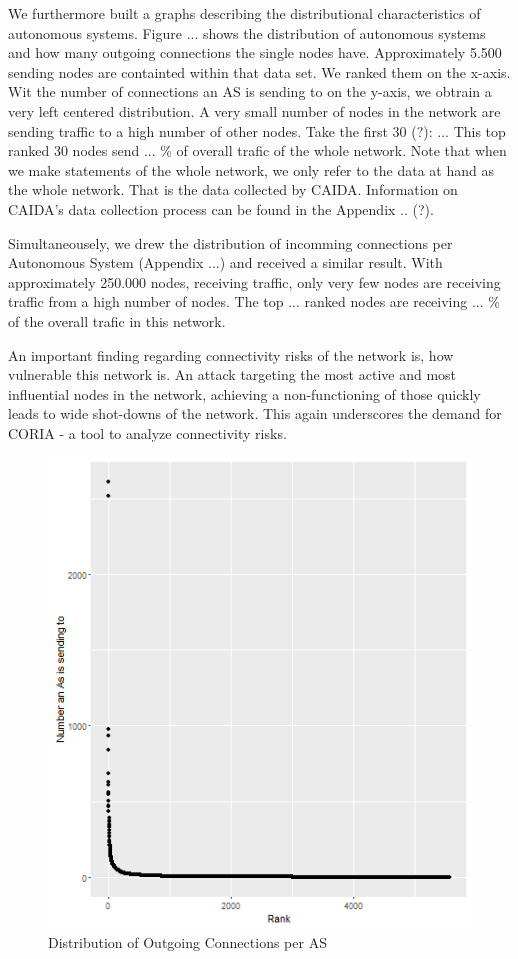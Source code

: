 \documentclass[conference]{IEEEtran}
\begin{document}
We furthermore built a graphs describing the distributional characteristics of autonomous systems. Figure ... shows the distribution of autonomous systems and how many outgoing connections the single nodes have. Approximately 5.500 sending nodes are containted within that data set. We ranked them on the x-axis. Wit the number of connections an AS is sending to on the y-axis, we obtrain a very left centered distribution. A very small number of nodes in the network are sending traffic to a high number of other nodes. Take the first 30 (?): ... This top ranked 30 nodes send ... \% of overall trafic of the whole network. Note that when we make statements of the whole network, we only refer to the data at hand as the whole network. That is the data collected by CAIDA. Information on CAIDA's data collection process can be found in the Appendix .. (?). 

Simultaneousely, we drew the distribution of incomming connections per Autonomous System (Appendix ...) and received a similar result. With approximately 250.000 nodes, receiving traffic, only very few nodes are receiving traffic from a high number of nodes. The top ... ranked nodes are receiving ... \% of the overall trafic in this network. 

An important finding regarding connectivity risks of the network is, how vulnerable this network is. An attack targeting the most active and most influential nodes in the network, achieving a non-functioning of those quickly leads to wide shot-downs of the network.  This again underscores the demand for CORIA - a tool to analyze connectivity risks. 


\begin{figure}[htbp]
\centerline{\includegraphics[scale=0.4]{Graphics/AsFromDistribution.png}}
\caption{Distribution of Outgoing Connections per AS}
\label{fig}
\end{figure}
\end{document}
